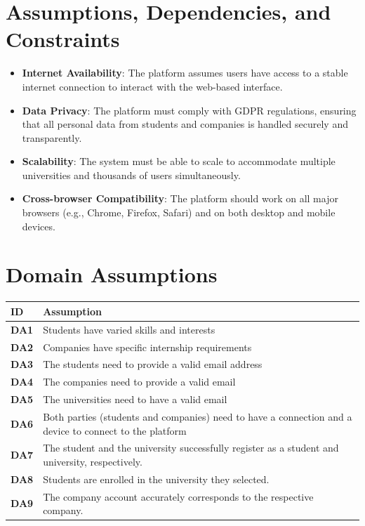 \section{Assumptions, Dependencies, and Constraints}
\begin{itemize}
    \item \textbf{Internet Availability}: The platform assumes users have access to a stable internet connection to interact with the web-based interface.
    \item \textbf{Data Privacy}: The platform must comply with GDPR regulations, ensuring that all personal data from students and companies is handled securely and transparently.
    \item \textbf{Scalability}: The system must be able to scale to accommodate multiple universities and thousands of users simultaneously.
    \item \textbf{Cross-browser Compatibility}: The platform should work on all major browsers (e.g., Chrome, Firefox, Safari) and on both desktop and mobile devices.
\end{itemize}

\section{Domain Assumptions}
\begin{longtable}{|p{1cm}|p{4cm}|}
\hline
\textbf{ID} & \textbf{Assumption} \\
\hline
\textbf{DA1} & Students have varied skills and interests \\
\hline
\textbf{DA2} & Companies have specific internship requirements \\
\hline
\textbf{DA3} & The students need to provide a valid email address \\
\hline
\textbf{DA4} & The companies need to provide a valid email \\
\hline
\textbf{DA5} & The universities need to have a valid email \\
\hline
\textbf{DA6} & Both parties (students and companies) need to have a connection and a device to connect to the platform \\
\hline
\textbf{DA7} & The student and the university successfully register as a student and university, respectively. \\
\hline
\textbf{DA8} & Students are enrolled in the university they selected. \\
\hline
\textbf{DA9} & The company account accurately corresponds to the respective company. \\
\hline
\end{longtable}
\newpage